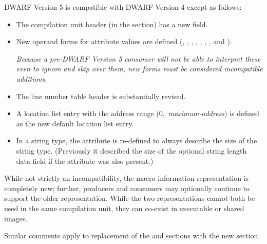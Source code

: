 DWARF Version 5 is compatible with DWARF Version 4 except as follows:
\begin{itemize}
\item The compilation unit header (in the \dotdebuginfo{} section) has
a new \HFNunittype{} field.
\item New operand forms for attribute values are defined 
(\DWFORMaddrxNAME, \DWFORMdatasixteenNAME, \DWFORMimplicitconstNAME, 
\DWFORMlinestrpNAME,
\bb
\DWFORMloclistxNAME, \DWFORMrnglistxNAME,
\eb 
\DWFORMrefsupNAME, \DWFORMstrpsupNAME{} and \DWFORMstrxNAME).
\eb

\textit{Because a pre-DWARF Version 5 consumer will not be able to interpret 
these even to ignore and skip over them, new forms must be 
considered incompatible additions.}
\item The line number table header is substantially revised.
\item A location list entry 
with the address range \mbox{(0, \textit{maximum-address})} is defined 
as the new default location list entry.
\item In a string type, the \DWATbytesizeNAME{} attribute is re-defined 
to always describe the size of the string type. 
(Previously it described the size of the optional string length data 
field if the \DWATstringlengthNAME{} attribute was also present.)
\end{itemize}

While not strictly an incompatibility, the macro information 
representation is completely new; further, producers 
and consumers may optionally continue to support the older 
representation. While the two representations cannot both be 
used in the same compilation unit, they can co-exist in 
executable or shared images.

Similar comments apply to replacement of the \dotdebugpubnames{} 
and \dotdebugpubtypes{} sections with the new \dotdebugnames{} 
section.

